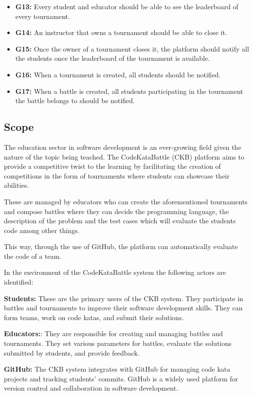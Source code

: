 \documentclass{article}
\begin{document}
\begin{itemize}
    \item \textbf{G13:} Every student and educator should be able to see the leaderboard of every tournament.
    \item \textbf{G14:} An instructor that owns a tournament should be able to close it.
    \item \textbf{G15:} Once the owner of a tournament closes it, the platform should notify all the students once the leaderboard of the tournament is available.
    \item \textbf{G16:} When a tournament is created, all students should be notified. 
    \item \textbf{G17:} When a battle is created, all students participating in the tournament the battle belongs to should be notified.
\end{itemize}

\newpage

\subsection{Scope}  

The education sector in software development is an ever-growing field given the nature of the topic 
being teached. The CodeKataBattle (CKB) platform aims to provide a competitive twist to the learning
by facilitating the creation of competitions in the form of tournaments where students can showcase their abilities.

These are managed by educators who can create the aforementioned tournaments and compose battles where they can decide 
the programming language, the description of the problem and the test cases which will evaluate the students code among other things.

This way, through the use of GitHub, the platform can automatically evaluate the code of a team.

In the environment of the CodeKataBattle system the following actors are identified:

\textbf{Students:} These are the primary users of the CKB system. They participate in battles and tournaments to improve their software development skills. They can form teams, work on code katas, and submit their solutions.

\textbf{Educators:}: They are responsible for creating and managing battles and tournaments. They set various parameters for battles, evaluate the solutions submitted by students, and provide feedback.

\textbf{GitHub:} The CKB system integrates with GitHub for managing code kata projects and tracking students' commits. GitHub is a widely used platform for version control and collaboration in software development.
\end{document}

